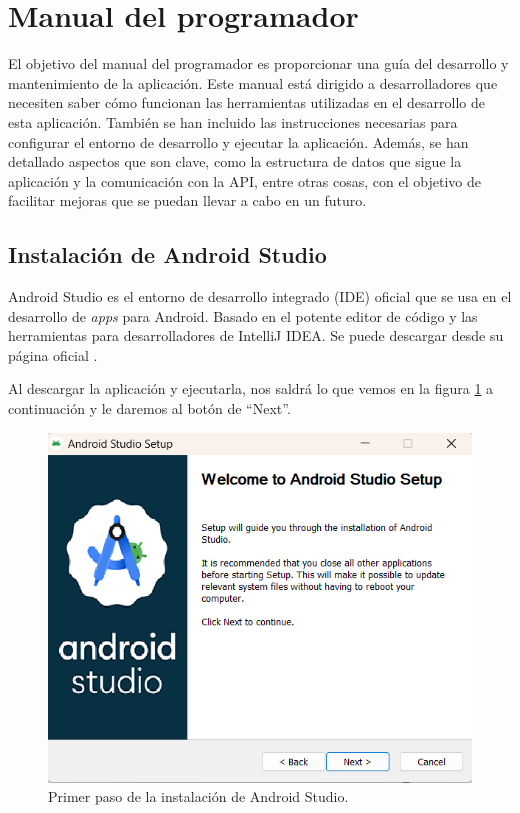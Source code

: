 \section{Manual del programador}
El objetivo del manual del programador es proporcionar una guía del desarrollo y mantenimiento de la aplicación. Este manual está dirigido a desarrolladores que necesiten saber cómo funcionan las herramientas utilizadas en el desarrollo de esta aplicación.
También se han incluido las instrucciones necesarias para configurar el entorno de desarrollo y ejecutar la aplicación.
Además, se han detallado aspectos que son clave, como la estructura de datos que sigue la aplicación y la comunicación con la API, entre otras cosas, con el objetivo de facilitar mejoras que se puedan llevar a cabo en un futuro.


\subsection{\textbf{Instalación de Android Studio}}
Android Studio es el entorno de desarrollo integrado (IDE) oficial que se usa en el desarrollo de \textit{apps} para Android. Basado en el potente editor de código y las herramientas para desarrolladores de IntelliJ IDEA.
Se puede descargar desde su página oficial \cite{AndroidStudio}.




Al descargar la aplicación y ejecutarla, nos saldrá lo que vemos en la figura \ref{C1} a continuación y le daremos al botón de ``Next''.
\begin{figure}[H]
    \centering
    \includegraphics[width=0.8\linewidth]{AndroidStudio1.png}
    \caption{Primer paso de la instalación de Android Studio.}
    \label{C1}
\end{figure}

